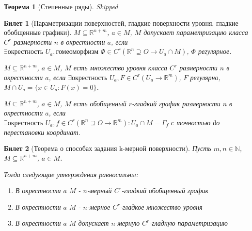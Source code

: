 \documentclass[11pt,a4paper,oneside]{scrartcl}
\newtheorem*{theorem}{Теорема}
\newtheorem{ticket}{Билет}
\begin{document}
\begin{theorem}[Степенные ряды]
    Skipped
\end{theorem}

\setcounter{ticket}{19}
\addtocounter{ticket}{-1}
\begin{ticket}[Параметризации поверхностей, гладкие поверхности уровня, гладкие обобщенные графики]

    $M \subseteq \mathbb{R}^{n+m}$, $a \in M$, $M$ допускает параметризацию класса $C^r$
    размерности $n$ в окрестности $a$, если $\exists \text{окрестность } U_a,
    \text{гомеоморфизм } \Phi \in C^r (\mathbb{R}^n \supseteq O \rightarrow U_a \cap M)$,
    $\Phi$ регулярное.

    $M \subseteq \mathbb{R}^{n+m}$, $a \in M$, $M$ есть множество уровня класса $C^r$
    размерности $n$ в окрестности $a$, если $\exists \text{окрестность } U_a,
    F \in C^r(U_a \rightarrow \mathbb{R}^m)$, $F$ регулярно, $M \cap U_a = \{x \in U_a : F(x) = 0\}$.

    $M \subseteq \mathbb{R}^{n+m}$, $a \in M$, $M$ есть обобщенный $r$-гладкий график
    размерности $n$ в окрестности $a$, если \\ $\exists \text{окрестность } U_a,
    f \in C^r (\mathbb{R}^n \supseteq O \rightarrow \mathbb{R}^m) : U_a \cap M = \Gamma_f$
    с точностью до перестановки координат.
\end{ticket}

\addtocounter{ticket}{-1}
\begin{ticket}[Теорема о способах задания k-мерной поверхности]
    Пусть $m, n \in \mathbb{N}$, $M \subseteq \mathbb{R}^{n+m}$, $a \in M$.

    Тогда следующие утверждения равносильны:
    \begin{enumerate}
        \item В окрестности $a$ $M$ - $n$-мерный $C^r$-гладкий обобщенный график
        \item В окрестности $a$ $M$ - $n$-мерное $C^r$-гладкое множество уровня
        \item В окрестности $a$ $M$ допускает $n$-мерную $C^r$-гладкую параметризацию
    \end{enumerate}
\end{ticket}
\end{document}
